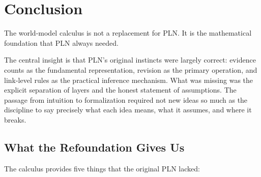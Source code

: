 \chapter{Conclusion}
\label{ch:conclusion}

The world-model calculus is not a replacement for PLN\@.  It is the
mathematical foundation that PLN always needed.

The central insight is that PLN's original instincts were largely
correct: evidence counts as the fundamental representation, revision
as the primary operation, and link-level rules as the practical
inference mechanism.  What was missing was the explicit separation of
layers and the honest statement of assumptions.  The passage from
intuition to formalization required not new ideas so much as the
discipline to say precisely what each idea means, what it assumes, and
where it breaks.

\section{What the Refoundation Gives Us}

The calculus provides five things that the original PLN lacked:

